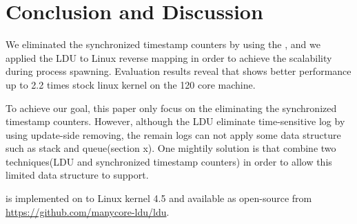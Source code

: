 \section{Conclusion and Discussion}
We eliminated the synchronized timestamp counters by using the \LDU, and
we applied the LDU to Linux reverse mapping in order to achieve the scalability
during process spawning.
Evaluation results reveal that  shows better performance up to 2.2 times
stock linux kernel on the 120 core machine.

To achieve our goal, this paper only focus on the eliminating the synchronized
timestamp counters.
However, although the LDU eliminate time-sensitive log by using update-side
removing, the remain logs can not apply some data structure such as stack and
queue(section x).
One mightily solution is that combine two techniques(LDU and synchronized
timestamp counters) in order to allow this limited data structure to support.

 is implemented on to Linux kernel 4.5 and available as open-source
 from \url{https://github.com/manycore-ldu/ldu}.


